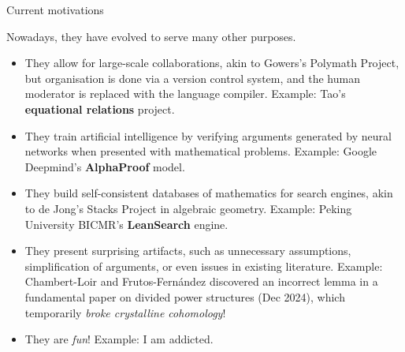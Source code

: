 \documentclass[10pt]{beamer}
\begin{document}
\begin{frame}[t]{Current motivations}

Nowadays, they have evolved to serve many other purposes.

\pause

\begin{itemize}
\item They allow for large-scale collaborations, akin to Gowers's Polymath Project, but organisation is done via a version control system, and the human moderator is replaced with the language compiler. Example: Tao's \textbf{equational relations} project.

\pause

\item They train artificial intelligence by verifying arguments generated by neural networks when presented with mathematical problems. Example: Google Deepmind's \textbf{AlphaProof} model.

\pause

\item They build self-consistent databases of mathematics for search engines, akin to de Jong's Stacks Project in algebraic geometry. Example: Peking University BICMR's \textbf{LeanSearch} engine.

\pause

\item They present surprising artifacts, such as unnecessary assumptions, simplification of arguments, or even issues in existing literature. Example: Chambert-Loir and Frutos-Fern\'andez discovered an incorrect lemma in a fundamental paper on divided power structures (Dec 2024), which temporarily \emph{broke crystalline cohomology}!

\pause

\item They are \emph{fun}! Example: I am addicted.
\end{itemize}

\end{frame}
\end{document}
